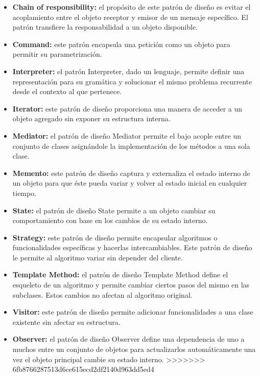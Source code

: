 \documentclass[twoside,twocolumn]{article}
\begin{document}
\begin{itemize}
\begin{itemize}
\begin{itemize}
	\begin{itemize}
		\item \textbf{Chain of responsibility:}	el propósito de este patrón de diseño es evitar el acoplamiento entre el objeto receptor y emisor de un mensaje específico. El patrón transfiere la responsabilidad a un objeto disponible.  
		\item \textbf{Command:} este patrón encapsula una petición como un objeto para permitir su parametrización.   
		\item \textbf{Interpreter:} el patrón Interpreter, dado un lenguaje, permite definir una representación para su gramática y solucionar el mismo problema recurrente desde el contexto al que pertenece.  
		\item \textbf{Iterator:}	este patrón de diseño proporciona una manera de acceder a un objeto agregado sin exponer su estructura interna.  
		\item \textbf{Mediator:}  el patrón de diseño Mediator permite el bajo acople entre un conjunto de clases asignándole la implementación de los métodos a una sola clase.   
		\item \textbf{Memento:} este patrón de diseño captura y externaliza el estado interno de un objeto para que éste pueda variar y volver al estado inicial en cualquier tiempo.   
		\item \textbf{State:} el patrón de diseño State permite a un objeto cambiar su comportamiento con base en los cambios de su estado interno.  
        \item \textbf{Strategy:} este patrón de diseño permite encapsular algoritmos o funcionalidades específicas y hacerlas intercambiables. Este patrón de diseño le permite al algoritmo variar sin depender del cliente.  
        \item \textbf{Template Method:} el patrón de diseño Template Method define el esqueleto de un algoritmo y permite cambiar ciertos pasos del mismo en las subclases. Estos cambios no afectan al algoritmo original.  
        \item \textbf{Visitor:} este patrón de diseño permite adicionar funcionalidades a una clase existente sin afectar su estructura. 
        \item \textbf{Observer:} el patrón de diseño Observer define una dependencia de uno a muchos entre un conjunto de objetos para actualizarlos automáticamente una vez el objeto principal cambie su estado interno. 
>>>>>>> 6fb8766287513d6ce615ecd2df2140d963dd5ed4
        \\
        \\
    \end{itemize}



\end{itemize}
\end{itemize}
\end{itemize}
\end{document}
